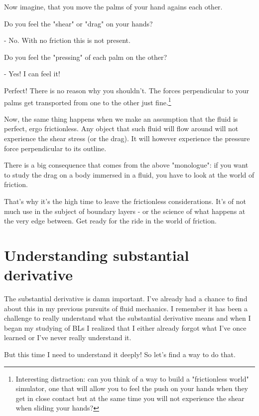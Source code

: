 \documentclass[12pt]{report}
\begin{document}
Now imagine, that you move the palms of your hand agains each other.

Do you feel the "shear" or "drag" on your hands?

- No. With no friction this is not present.

Do you feel the "pressing" of each palm on the other?

- Yes! I can feel it!

Perfect! There is no reason why you shouldn't. The forces perpendicular to your palms get transported from one to the other just fine.\footnote{Interesting distraction: can you think of a way to build a "frictionless world" simulator, one that will allow you to feel the push on your hands when they get in close contact but at the same time you will not experience the shear when sliding your hands?}

Now, the same thing happens when we make an assumption that the fluid is perfect, ergo frictionless. Any object that such fluid will flow around will not experience the shear stress (or the drag). It will however experience the pressure force perpendicular to its outline.

There is a big consequence that comes from the above "monologue": if you want to study the drag on a body immersed in a fluid, you have to look at the world of friction.

That's why it's the high time to leave the frictionless considerations. It's of not much use in the subject of boundary layers - or the science of what happens at the very edge between. Get ready for the ride in the world of friction.







\section{Understanding substantial derivative} \label{chap:deriv}

The substantial derivative is damn important. I've already had a chance to find about this in my previous pursuits of fluid mechanics. I remember it has been a challenge to really understand what the substantial derivative means and when I began my studying of BLs I realized that I either already forgot what I've once learned or I've never really understand it.

But this time I need to understand it deeply! So let's find a way to do that.
\end{document}

